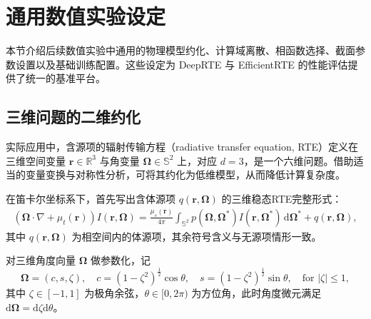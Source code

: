 \section {通用数值实验设定}
\label {sec:common-experiments}

本节介绍后续数值实验中通用的物理模型约化、计算域离散、相函数选择、截面参数设置以及基础训练配置。这些设定为 DeepRTE 与 EfficientRTE 的性能评估提供了统一的基准平台。

\subsection{三维问题的二维约化}

实际应用中，含源项的辐射传输方程（radiative transfer equation, RTE）定义在三维空间变量 $\boldsymbol{r}\in\mathbb{R}^3$ 与角变量 $\boldsymbol{\Omega}\in\mathbb{S}^2$ 上，对应 $d=3$，是一个六维问题。借助适当的变量变换与对称性分析，可将其约化为低维模型，从而降低计算复杂度。

在笛卡尔坐标系下，首先写出含体源项 $q(\boldsymbol{r},\boldsymbol{\Omega})$ 的三维稳态RTE完整形式：
\begin{equation}\label{eq:rte-3d-source}
    \begin{aligned}
        (\boldsymbol{\Omega}\cdot\nabla + \mu_t(\boldsymbol{r})) I(\boldsymbol{r},\boldsymbol{\Omega})
        = \frac{\mu_s(\boldsymbol{r})}{4\pi} \int_{\mathbb{S}^2} p(\boldsymbol{\Omega},\boldsymbol{\Omega}^*) I(\boldsymbol{r},\boldsymbol{\Omega}^*) \,\mathrm{d}\boldsymbol{\Omega}^*
        + q(\boldsymbol{r},\boldsymbol{\Omega}),
    \end{aligned}
\end{equation}
其中 $q(\boldsymbol{r},\boldsymbol{\Omega})$ 为相空间内的体源项，其余符号含义与无源项情形一致。

对三维角度向量 $\boldsymbol{\Omega}$ 做参数化，记
\begin{equation}
    \boldsymbol{\Omega}=(c,s,\zeta), \quad c =
        {\left(1-\zeta^{2}\right)}^{\frac{1}{2}} \cos\theta, \quad s =
        {\left(1-\zeta^{2}\right)}^{\frac{1}{2}} \sin\theta, \quad \text{for }|\zeta| \leq 1,
\end{equation}
其中 $\zeta\in[-1,1]$ 为极角余弦，$\theta\in[0,2\pi)$ 为方位角，此时角度微元满足 $\mathrm{d}\boldsymbol{\Omega} = \mathrm{d}\zeta \mathrm{d}\theta$。

